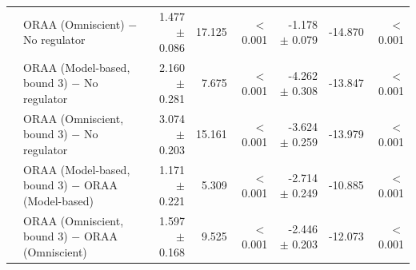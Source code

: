 \begin{tabular}{llrrrrrr}
 & ORAA (Omniscient) $-$ No regulator & 1.477 $\pm$ 0.086 & 17.125 & $<$0.001 & -1.178 $\pm$ 0.079 & -14.870 & $<$0.001 \\
 & ORAA (Model-based, bound 3) $-$ No regulator & 2.160 $\pm$ 0.281 & 7.675 & $<$0.001 & -4.262 $\pm$ 0.308 & -13.847 & $<$0.001 \\
 & ORAA (Omniscient, bound 3) $-$ No regulator & 3.074 $\pm$ 0.203 & 15.161 & $<$0.001 & -3.624 $\pm$ 0.259 & -13.979 & $<$0.001 \\
 & ORAA (Model-based, bound 3) $-$ ORAA (Model-based) & 1.171 $\pm$ 0.221 & 5.309 & $<$0.001 & -2.714 $\pm$ 0.249 & -10.885 & $<$0.001 \\
 & ORAA (Omniscient, bound 3) $-$ ORAA (Omniscient) & 1.597 $\pm$ 0.168 & 9.525 & $<$0.001 & -2.446 $\pm$ 0.203 & -12.073 & $<$0.001 \\
\bottomrule
\end{tabular}
